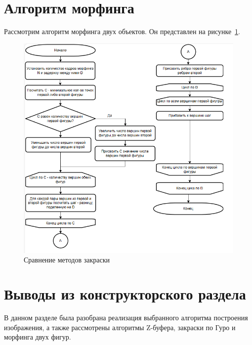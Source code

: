 \section{Алгоритм морфинга}

Рассмотрим алгоритм морфинга двух объектов. Он представлен на рисунке~\ref{fig:morph_algorithm}.

\begin{figure}[H]
	\centering
	\includegraphics[scale=0.85]{images/morph_algo.png}
	\caption{Сравнение методов закраски}
	\label{fig:morph_algorithm}
\end{figure}


\section*{Выводы из конструкторского раздела}

В данном разделе была разобрана реализация выбранного алгоритма построения изображения, а также рассмотрены алгоритмы
Z-буфера, закраски по Гуро и морфинга двух фигур.

